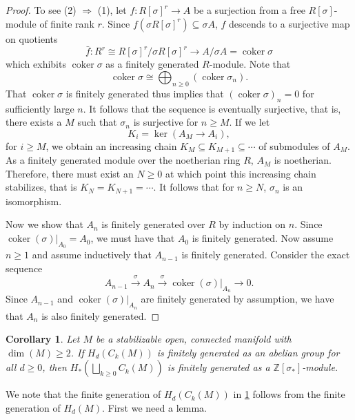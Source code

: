 \documentclass[11pt]{amsart}
\newtheorem{corollary}[equation]{Corollary}
\theoremstyle{definition}
\numberwithin{equation}{subsection} %
\def\l{\mathbb{L}}
\def\z{\mathbb{Z}}
\def\ker{\operatorname{ker}}
\def\coker{\operatorname{coker}}
\renewcommand{\l}{\overset}
\newcommand{\too}[1]{\l{#1}\to}
\begin{document}
\begin{proof}
To see (2) $\Rightarrow$ (1), let $f:R[\sigma]^r\to A$ be a surjection from a free $R[\sigma]$-module of finite rank $r$. Since $f(\sigma R[\sigma]^r)\subseteq \sigma A$, $f$ descends to a surjective map on quotients 
$$ \bar{f}: R^r \cong R[\sigma]^r/\sigma R[\sigma]^r \to A/\sigma A = \coker\sigma$$
which exhibits $\coker\sigma$ as a finitely generated $R$-module. 
Note that 
$$ \coker\sigma \cong \bigoplus_{n\geq 0} (\coker\sigma_n). $$
That $\coker\sigma$ is finitely generated thus implies that $(\coker\sigma)_n=0$ for sufficiently large $n$. It follows that the sequence is eventually surjective, that is, there exists a $M$ such that $\sigma_n$ is surjective for $n\geq M$. If we let
$$ K_i = \ker(A_M \to A_i), $$
for $i\geq M$, we obtain an increasing chain $K_M\subseteq K_{M+1}\subseteq\cdots$ of submodules of $A_M$. As a finitely generated module over the noetherian ring $R$, $A_M$ is noetherian. Therefore, there must exist an $N\geq 0$ at which point this increasing chain stabilizes, that is $K_N=K_{N+1}=\cdots$. It follows that for $n\geq N$, $\sigma_n$ is an isomorphism.

Now we show that $A_n$ is finitely generated over $R$ by induction on $n$. Since
$\coker(\sigma)|_{A_0} = A_0$, we must have that $A_0$ is finitely generated.
Now assume $n\geq 1$ and assume inductively that $A_{n-1}$ is finitely
generated. Consider the exact sequence
$$ A_{n-1}\too{\sigma} A_n \too{\sigma} \coker(\sigma)|_{A_n}\to 0. $$
Since $A_{n-1}$ and $\coker(\sigma)|_{A_n}$ are finitely generated by
assumption, we have that $A_n$ is also finitely generated.
\end{proof}

\begin{corollary}\label{Cor:WeakStability}
Let $M$ be a stabilizable open, connected manifold with $\dim(M) \geq 2$. If $H_d(C_k(M))$ is finitely generated as an abelian group for all $d \geq 0$, then
$H_*(\bigsqcup_{k \geq 0} C_k(M))$ is finitely generated as a $\z[\sigma_*]$-module. 
\end{corollary}

We note that the finite generation of $H_d(C_k(M))$ in \cref{Cor:WeakStability} follows from the finite generation of $H_d(M)$. First we need a lemma.
\end{document}
